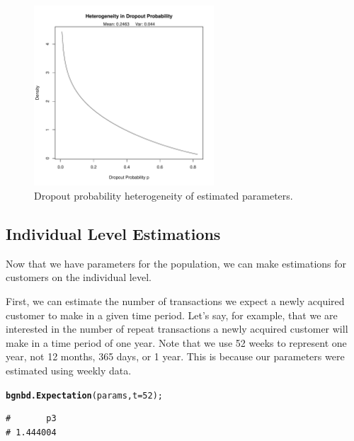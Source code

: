 \documentclass[10pt, letterpaper, onecolumn, oneside, final]{article}\usepackage[]{graphicx}\usepackage[]{color}
\makeatletter
\newcommand{\hlnum}[1]{\textcolor[rgb]{0.686,0.059,0.569}{#1}}%
\newcommand{\hlstd}[1]{\textcolor[rgb]{0.345,0.345,0.345}{#1}}%
\newcommand{\hlkwc}[1]{\textcolor[rgb]{0.333,0.667,0.333}{#1}}%
\newcommand{\hlkwd}[1]{\textcolor[rgb]{0.737,0.353,0.396}{\textbf{#1}}}%
\newenvironment{kframe}{%
 \def\at@end@of@kframe{}%
 \ifinner\ifhmode%
  \def\at@end@of@kframe{\end{minipage}}%
  \begin{minipage}{\columnwidth}%
 \fi\fi%
 \def\FrameCommand##1{\hskip\@totalleftmargin \hskip-\fboxsep
 \colorbox{shadecolor}{##1}\hskip-\fboxsep
     \hskip-\linewidth \hskip-\@totalleftmargin \hskip\columnwidth}%
 \MakeFramed {\advance\hsize-\width
   \@totalleftmargin\z@ \linewidth\hsize
   \@setminipage}}%
 {\par\unskip\endMakeFramed%
 \at@end@of@kframe}
\newenvironment{knitrout}{}{} %
\makeatother
\begin{document}
\begin{figure}
  \begin{center}
  \includegraphics[width=0.6\textwidth]{figure/bgnbdDropoutHeterogeneity}
  \caption{Dropout probability heterogeneity of estimated parameters.}\label{fig:bgnbdDropoutHeterogeneity}
  \end{center}
\end{figure}
 
\subsection{Individual Level Estimations}
Now that we have parameters for the population, we can make
estimations for customers on the individual level.

First, we can estimate the number of transactions we expect a newly
acquired customer to make in a given time period. Let's say, for
example, that we are interested in the number of repeat transactions a
newly acquired customer will make in a time period of one year. Note
that we use 52 weeks to represent one year, not 12 months, 365 days,
or 1 year. This is because our parameters were estimated using weekly
data.

\begin{knitrout}
\color{fgcolor}\begin{kframe}
\begin{alltt}
\hlkwd{bgnbd.Expectation}\hlstd{(params,} \hlkwc{t}\hlstd{=}\hlnum{52}\hlstd{);}
\end{alltt}
\begin{verbatim}
#       p3 
# 1.444004
\end{verbatim}
\end{kframe}
\end{knitrout}
\end{document}
